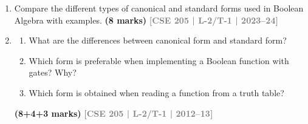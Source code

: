 \documentclass[12pt]{article}
\newcommand{\yr}[1]{\hfill\textcolor{gray}{\small\textbf{[#1]}}}
\newcommand{\mk}[1]{\textcolor{orange!70!black}{\small\textbf{(#1 marks)}}}
\begin{document}
\begin{enumerate}

\item Compare the different types of canonical and standard forms used in Boolean Algebra with examples.
\mk{8} \yr{CSE 205 | L-2/T-1 | 2023--24}



\item
\begin{enumerate}
  \item What are the differences between canonical form and standard form?
  \item Which form is preferable when implementing a Boolean function with gates? Why?
  \item Which form is obtained when reading a function from a truth table?
\end{enumerate}
\mk{8+4+3} \yr{CSE 205 | L-2/T-1 | 2012--13}



\end{enumerate}
\end{document}
